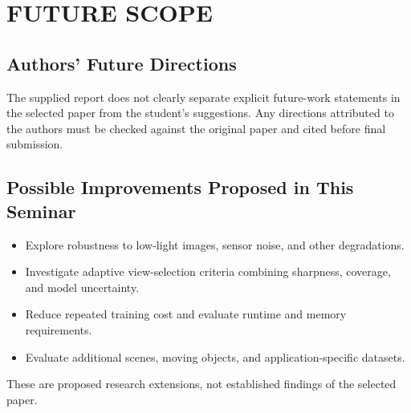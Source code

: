 \chapter{\MakeUppercase{Future Scope}}
\setcounter{equation}{0}

\section{Authors' Future Directions}
The supplied report does not clearly separate explicit future-work statements in the selected paper from the student's suggestions. Any directions attributed to the authors must be checked against the original paper and cited before final submission.
\section{Possible Improvements Proposed in This Seminar}
\begin{itemize}
\item Explore robustness to low-light images, sensor noise, and other degradations.
\item Investigate adaptive view-selection criteria combining sharpness, coverage, and model uncertainty.
\item Reduce repeated training cost and evaluate runtime and memory requirements.
\item Evaluate additional scenes, moving objects, and application-specific datasets.
\end{itemize}
These are proposed research extensions, not established findings of the selected paper.
